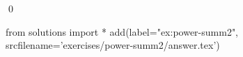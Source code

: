 
\begin{ex} 
  \label{ex:power-summ2}
  
  \qed
\end{ex} 
\begin{python0}
from solutions import *
add(label="ex:power-summ2",
    srcfilename='exercises/power-summ2/answer.tex') 
\end{python0}
